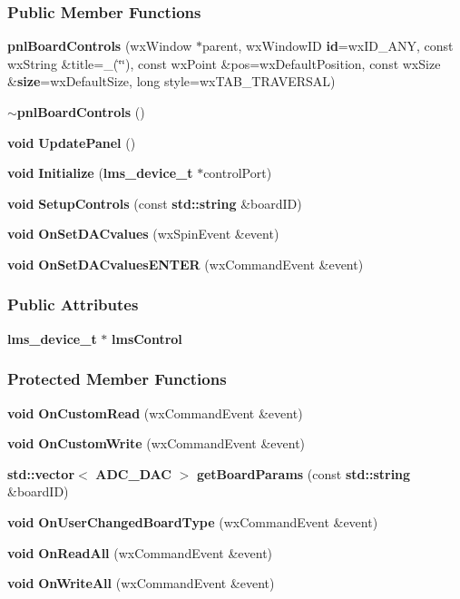 \subsubsection*{Public Member Functions}
\begin{DoxyCompactItemize}
\item 
{\bf pnl\+Board\+Controls} (wx\+Window $\ast$parent, wx\+Window\+ID {\bf id}=wx\+I\+D\+\_\+\+A\+NY, const wx\+String \&title=\+\_\+(\char`\"{}\char`\"{}), const wx\+Point \&pos=wx\+Default\+Position, const wx\+Size \&{\bf size}=wx\+Default\+Size, long style=wx\+T\+A\+B\+\_\+\+T\+R\+A\+V\+E\+R\+S\+AL)
\item 
{\bf $\sim$pnl\+Board\+Controls} ()
\item 
{\bf void} {\bf Update\+Panel} ()
\item 
{\bf void} {\bf Initialize} ({\bf lms\+\_\+device\+\_\+t} $\ast$control\+Port)
\item 
{\bf void} {\bf Setup\+Controls} (const {\bf std\+::string} \&board\+ID)
\item 
{\bf void} {\bf On\+Set\+D\+A\+Cvalues} (wx\+Spin\+Event \&event)
\item 
{\bf void} {\bf On\+Set\+D\+A\+Cvalues\+E\+N\+T\+ER} (wx\+Command\+Event \&event)
\end{DoxyCompactItemize}
\subsubsection*{Public Attributes}
\begin{DoxyCompactItemize}
\item 
{\bf lms\+\_\+device\+\_\+t} $\ast$ {\bf lms\+Control}
\end{DoxyCompactItemize}
\subsubsection*{Protected Member Functions}
\begin{DoxyCompactItemize}
\item 
{\bf void} {\bf On\+Custom\+Read} (wx\+Command\+Event \&event)
\item 
{\bf void} {\bf On\+Custom\+Write} (wx\+Command\+Event \&event)
\item 
{\bf std\+::vector}$<$ {\bf A\+D\+C\+\_\+\+D\+AC} $>$ {\bf get\+Board\+Params} (const {\bf std\+::string} \&board\+ID)
\item 
{\bf void} {\bf On\+User\+Changed\+Board\+Type} (wx\+Command\+Event \&event)
\item 
{\bf void} {\bf On\+Read\+All} (wx\+Command\+Event \&event)
\item 
{\bf void} {\bf On\+Write\+All} (wx\+Command\+Event \&event)
\end{DoxyCompactItemize}
